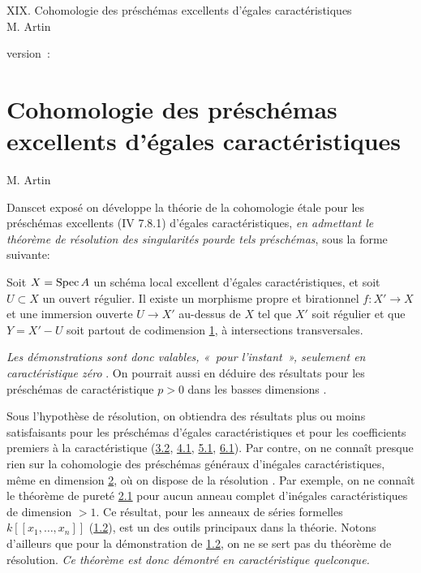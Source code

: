 \documentclass[10pt]{../fichiers-configuration-latex/smfart}
\begin{document}
\begin{center}
XIX. Cohomologie des préschémas excellents d'égales caractéristiques\\
M. Artin 
\end{center}

version : \showgitstatus{}
\tableofcontents

\else
\chapter{Cohomologie des préschémas excellents d'égales caractéristiques}
\begin{center}
M. Artin 
\end{center}
\fi

\newcommand{\UU}{\mathbf{U}}

Dans\pageoriginale cet exposé on développe la théorie de la
cohomologie étale pour 
les préschémas excellents (\EGA IV 7.8.1) d'égales caractéristiques,
\emph{en admettant le théorème de résolution des singularités
  pour\pageoriginale de tels préschémas}, sous la forme suivante:

Soit $X=\operatorname{Spec} A$ un schéma local excellent d'égales caractéristiques,
et soit $U\subset X$ un ouvert régulier. Il existe un morphisme propre
et birationnel $f:X'\rightarrow X$ et une immersion ouverte
$U\rightarrow X'$ au-dessus de $X$ tel que $X'$ soit régulier et que
$Y=X'-U$ soit partout de codimension \hyperref[XIX.sec1]{1}, 
à intersections transversales.

\emph{Les démonstrations sont donc valables, « pour l'instant »,
  seulement en caractéristique zéro} \cite{SGA4-19:4}. On pourrait aussi en déduire
  des résultats pour les préschémas de caractéristique $p>0$ dans les
  basses dimensions \cite{SGA4-19:1}.

Sous l'hypothèse de résolution, on obtiendra des résultats plus ou
moins satisfaisants pour les préschémas d'égales caractéristiques et
pour les coefficients premiers à la caractéristique (\cf \hyperref[XIX.thm3.2]{3.2}, \hyperref[XIX.thm4.1]{4.1},
\hyperref[XIX.thm5.1]{5.1}, \hyperref[XIX.thm6.1]{6.1}). Par contre, on ne connaît presque rien sur la cohomologie
des préschémas généraux d'inégales caractéristiques, même en dimension
\hyperref[XIX.sec2]{2}, où on dispose de la résolution \cite{SGA4-19:2}. Par exemple, on ne connaît le
théorème de pureté \hyperref[XIX.thm2.1]{2.1} pour aucun anneau complet d'inégales
caractéristiques de dimension $>1$. Ce résultat, pour les anneaux de
séries formelles $k[[x_{1},\ldots, x_{n}]]$ (\hyperref[XIX.thm1.2]{1.2}), est un des outils
principaux dans la théorie. Notons d'ailleurs que pour la
démonstration de \hyperref[XIX.thm1.2]{1.2}, on ne se sert pas du théorème de
résolution. \emph{Ce théorème est donc démontré en caractéristique
  quelconque.}
\end{document}
